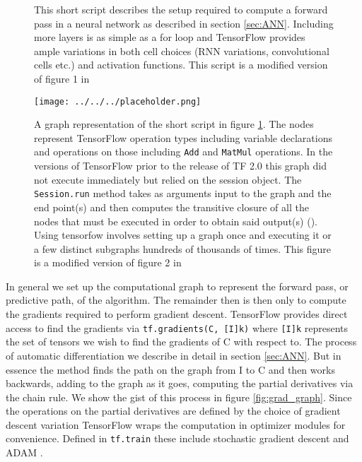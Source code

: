 \begin{figure}[H]
\centering

\caption{This short script describes the setup required to compute a forward pass in a neural network as described in section \ref{sec:ANN}. Including more layers is as simple as a for loop and TensorFlow provides ample variations in both cell choices (RNN variations, convolutional cells etc.) and activation functions. This script is a modified version of figure 1 in \cite{tensorflow}}\label{fig:graph}
\end{figure}
\begin{figure}
\texttt{[image: ../../../placeholder.png]}
\caption{A graph representation of the short script in figure \ref{fig:graph}. The nodes represent TensorFlow operation types including variable declarations and operations on those including \lstinline{Add} and \lstinline{MatMul} operations. In the versions of TensorFlow prior to the release of TF 2.0 this graph did not execute immediately but relied on the session object. The \lstinline{Session.run} method takes as arguments input to the graph and the end point(s) and then computes the transitive closure of all the nodes that must be executed in order to obtain said output(s) (\cite{tensorflow}). Using tensorfow involves setting up a graph once and executing it or a few distinct subgraphs hundreds of thousands of times. This figure is a modified version of figure 2 in \citet{tensorflow}}
\end{figure}

In general we set up the computational graph to represent the forward pass, or predictive path, of the algorithm. The remainder then is then only to compute the gradients required to perform gradient descent. TensorFlow provides direct access to find the gradients via \lstinline{tf.gradients(C, [I]k)} where \lstinline{[I]k} represents the set of tensors we wish to find the gradients of C with respect to. The process of automatic differentiation we describe in detail in section \ref{sec:ANN}. But in essence the method finds the path on the graph from I to C and then works backwards, adding to the graph as it goes, computing the partial derivatives via the chain rule. We show the gist of this process in figure \ref{fig:grad_graph}. Since the operations on the partial derivatives are defined by the choice of gradient descent variation TensorFlow wraps the computation in optimizer modules for convenience. Defined in \lstinline{tf.train} these include stochastic gradient descent and  ADAM . 
 
